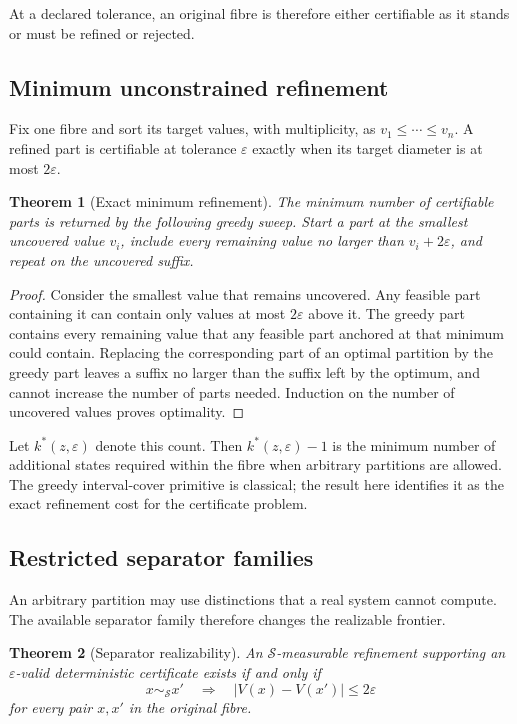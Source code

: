 \documentclass[10pt]{article}
\newtheorem{theorem}{Theorem}
\newcommand{\1}{\mathbf{1}}
\begin{document}
At a declared tolerance, an original fibre is therefore either certifiable as it stands or must be refined or rejected.

\subsection{Minimum unconstrained refinement}
Fix one fibre and sort its target values, with multiplicity, as $v_1\leq\cdots\leq v_n$. A refined part is certifiable at tolerance $\varepsilon$ exactly when its target diameter is at most $2\varepsilon$.

\begin{theorem}[Exact minimum refinement]
The minimum number of certifiable parts is returned by the following greedy sweep. Start a part at the smallest uncovered value $v_i$, include every remaining value no larger than $v_i+2\varepsilon$, and repeat on the uncovered suffix.
\end{theorem}

\begin{proof}
Consider the smallest value that remains uncovered. Any feasible part containing it can contain only values at most $2\varepsilon$ above it. The greedy part contains every remaining value that any feasible part anchored at that minimum could contain. Replacing the corresponding part of an optimal partition by the greedy part leaves a suffix no larger than the suffix left by the optimum, and cannot increase the number of parts needed. Induction on the number of uncovered values proves optimality.
\end{proof}

Let $k^*(z,\varepsilon)$ denote this count. Then $k^*(z,\varepsilon)-1$ is the minimum number of additional states required within the fibre when arbitrary partitions are allowed. The greedy interval-cover primitive is classical; the result here identifies it as the exact refinement cost for the certificate problem.

\subsection{Restricted separator families}
An arbitrary partition may use distinctions that a real system cannot compute. The available separator family therefore changes the realizable frontier.

\begin{theorem}[Separator realizability]
An $\mathcal S$-measurable refinement supporting an $\varepsilon$-valid deterministic certificate exists if and only if
\[
  x\sim_{\mathcal S}x'\quad\Longrightarrow\quad |V(x)-V(x')|\leq 2\varepsilon
\]
for every pair $x,x'$ in the original fibre.
\end{theorem}
\end{document}
